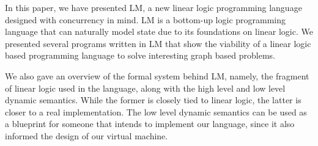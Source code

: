 In this paper, we have presented LM, a new linear logic programming language designed with concurrency in mind. LM is a bottom-up logic programming language
that can naturally model state due to its foundations on linear logic.
We presented several programs written in LM that show the viability of a linear logic based programming language to solve interesting graph based problems.

We also gave an overview of the formal system behind LM, namely, the fragment of linear logic used in the language, along with the high level and low level dynamic semantics.
While the former is closely tied to linear logic, the latter is closer to a real implementation. The low level dynamic semantics can be used as a blueprint for someone that
intends to implement our language, since it also informed the design of our virtual machine.